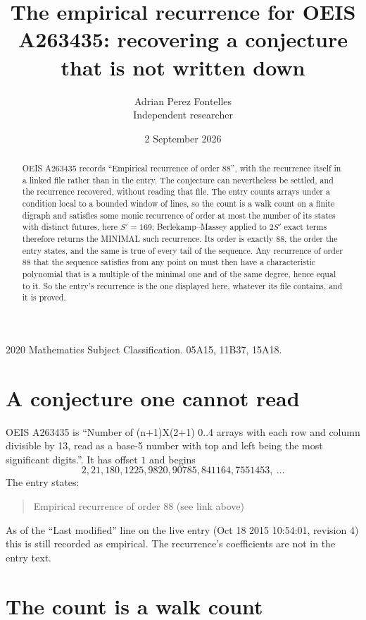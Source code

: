 \documentclass[11pt,a4paper]{article}
\title{The empirical recurrence for OEIS A263435: recovering a conjecture that is not written down}
\author{Adrian Perez Fontelles\\ \small Independent researcher}
\date{2 September 2026}
\theoremstyle{plain}
\theoremstyle{definition}
\begin{document}
\maketitle

\begin{abstract}
OEIS A263435 records ``Empirical recurrence of order $88$'', with the recurrence itself in a
linked file rather than in the entry. The conjecture can nevertheless be settled, and the
recurrence recovered, without reading that file. The entry counts arrays under a condition
local to a bounded window of lines, so the count is a walk count on a finite digraph and
satisfies some monic recurrence of order at most the number of its states with distinct
futures, here $S'=169$; Berlekamp--Massey applied to $2S'$ exact
terms therefore returns the MINIMAL such recurrence. Its order is exactly $88$, the order
the entry states, and the same is true of every tail of the sequence. Any recurrence of order
$88$ that the sequence satisfies from any point on must then have a characteristic
polynomial that is a multiple of the minimal one and of the same degree, hence equal to it. So
the entry's recurrence is the one displayed here, whatever its file contains, and it is
proved.
\end{abstract}

\noindent\small 2020 Mathematics Subject Classification. 05A15, 11B37, 15A18.\normalsize

\section{A conjecture one cannot read}

OEIS A263435 is ``Number of (n+1)X(2+1) 0..4 arrays with each row and column divisible by 13, read as a base-5 number with top and left being the most significant digits.''. It has offset $1$ and begins
\[
2, 21, 180, 1225, 9820, 90785, 841164, 7551453,\ \dots
\]
The entry states:
\begin{quote}
Empirical recurrence of order 88 (see link above)
\end{quote}
As of the ``Last modified'' line on the live entry (Oct 18 2015 10:54:01, revision 4) this is still
recorded as empirical. The recurrence's coefficients are not in the entry text.

\section{The count is a walk count}
\end{document}
